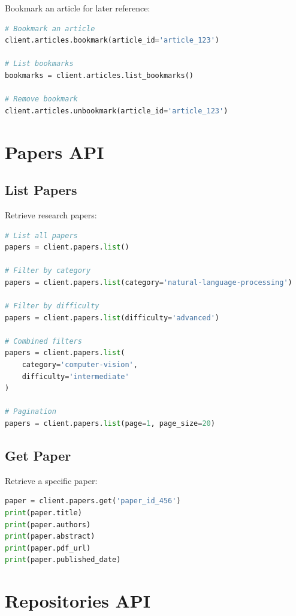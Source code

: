 \documentclass{report}
\begin{document}
Bookmark an article for later reference:

\begin{lstlisting}[language=Python]
# Bookmark an article
client.articles.bookmark(article_id='article_123')

# List bookmarks
bookmarks = client.articles.list_bookmarks()

# Remove bookmark
client.articles.unbookmark(article_id='article_123')
\end{lstlisting}

\section{Papers API}

\subsection{List Papers}

Retrieve research papers:

\begin{lstlisting}[language=Python]
# List all papers
papers = client.papers.list()

# Filter by category
papers = client.papers.list(category='natural-language-processing')

# Filter by difficulty
papers = client.papers.list(difficulty='advanced')

# Combined filters
papers = client.papers.list(
    category='computer-vision',
    difficulty='intermediate'
)

# Pagination
papers = client.papers.list(page=1, page_size=20)
\end{lstlisting}

\subsection{Get Paper}

Retrieve a specific paper:

\begin{lstlisting}[language=Python]
paper = client.papers.get('paper_id_456')
print(paper.title)
print(paper.authors)
print(paper.abstract)
print(paper.pdf_url)
print(paper.published_date)
\end{lstlisting}

\section{Repositories API}
\end{document}
